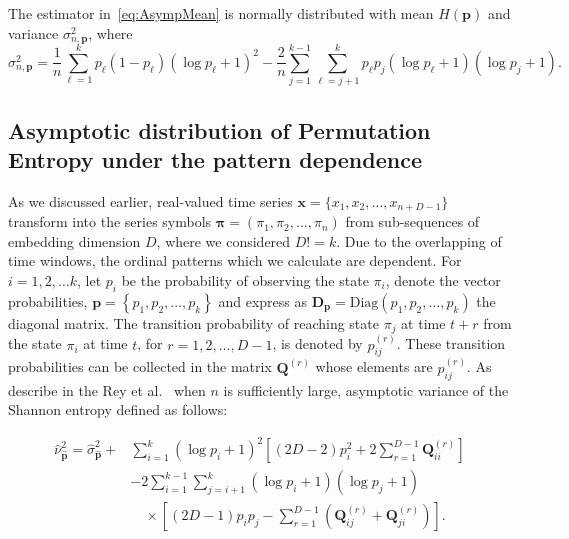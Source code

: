 \documentclass[12pt,a4paper]{article}
\begin{document}
The estimator in~\eqref{eq:AsympMean} is normally distributed with mean $H(\mathbf{p})$ and variance $\sigma^2_{n,\mathbf{p}}$, where
\begin{equation}
	\sigma^2_{n,\mathbf{p}}=\dfrac{1}{n}\sum_{\ell=1}^{k}p_\ell(1-p_\ell)(\log p_\ell+1)^2-\dfrac{2}{n}\sum_{j=1}^{k-1}\sum_{\ell=j+1}^{k}p_\ell p_j(\log p_\ell+1)(\log p_j+1).
\end{equation}


\subsection{Asymptotic distribution of Permutation Entropy under the pattern dependence}\label{Subsec:PatternDependence}

As we discussed earlier, real-valued time series $\mathbf{x}=\{x_1,x_2,\dots,x_{n+D-1}\}$  transform into the series symbols $\mathbf{{\pi}}=({\pi}_1, {\pi}_2,\dots, {\pi}_n)$ from sub-sequences of embedding dimension $D$, where we considered $D!=k$. Due to the overlapping of time windows, the ordinal patterns which we calculate are dependent. 
For $i=1,2,\dots k$, let $p_i$ be the probability of observing the state $\pi_i$, denote the vector probabilities, $\mathbf{p}={\left\{p_1,p_2,\dots,p_k\right\}}$ and express as $\mathbf{D_p}=\text{Diag}(p_1,p_2, \dots, p_k)$ the diagonal matrix. 
The transition probability of reaching state $\pi_j$ at time 
$t+r$ from the state $\pi_i$ at time $t$, for $r=1,2,\dots,D-1$, is denoted by $p^{(r)}_{ij}$. These transition probabilities can be collected in the matrix $\mathbf{Q}^{(r)}$ whose elements are  $p^{(r)}_{ij}$. As describe in the Rey et al.~\cite{Rey2023a} when $n$ is sufficiently large, asymptotic variance of the Shannon entropy defined as follows:

\begin{equation}
	\begin{split}
		\widehat{\nu}^2_{\widehat{\mathbf{p}}} = \widehat{\sigma}^2_{\widehat{\mathbf{p}}} + 
		& \sum_{i=1}^{k}(\log p_i + 1)^2 
		\left[ (2D - 2)p_i^2 + 2\sum_{r=1}^{D-1} \mathbf{Q}^{(r)}_{ii} \right] \\
		& - 2 \sum_{i=1}^{k-1} \sum_{j=i+1}^{k} (\log p_i + 1)(\log p_j + 1) \\
		& \quad \times \left[ (2D - 1)p_i p_j - \sum_{r=1}^{D-1} \left( \mathbf{Q}^{(r)}_{ij} + \mathbf{Q}^{(r)}_{ji} \right) \right].
	\end{split}
	\label{eq:asympvar}
\end{equation} 
\end{document}
